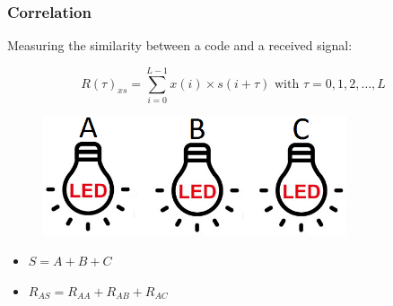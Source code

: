 \documentclass{beamer}
\begin{document}
	\begin{frame}\frametitle{Correlation}
		
		Measuring the similarity between a code and a received signal:

		\begin{equation*}
			R(\tau)_{xs} = \displaystyle\sum_{i = 0} ^ {L - 1} x(i) \times s(i + \tau) {\text{  with $\tau = 0, 1, 2, \dotsc, L$}}
		\end{equation*}

		

		\vspace{10mm}
		\begin{minipage}{.5\linewidth}
			\begin{figure}
				\centering
				\includegraphics[width=0.8\textwidth]{correlation-leds.png}
			\end{figure}
		\end{minipage}%
		\begin{minipage}{.5\linewidth}
			\begin{itemize}
				\item $S = A + B + C$

				\item $R_{AS} = R_{AA} + R_{AB} + R_{AC}$

			\end{itemize}
		\end{minipage}

%
%
%


	\end{frame}



	
\end{document}
